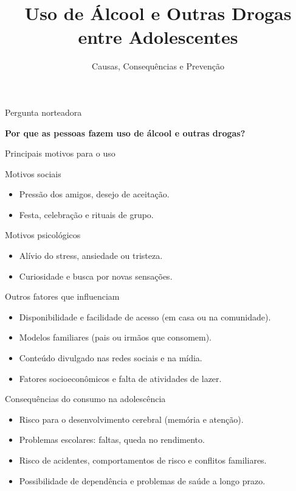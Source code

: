 \documentclass[aspectratio=169]{beamer}
\title{Uso de Álcool e Outras Drogas entre Adolescentes}
\subtitle{Causas, Consequências e Prevenção}
\author{}
\date{}
\begin{document}
\begin{frame}
  \titlepage
\end{frame}

\begin{frame}{Pergunta norteadora}
  \begin{center}
    \Large{\textbf{Por que as pessoas fazem uso de álcool e outras drogas?}}
  \end{center}
\end{frame}

\begin{frame}{Principais motivos para o uso}
  \begin{block}{Motivos sociais}
    \begin{itemize}
      \item Pressão dos amigos, desejo de aceitação.
      \item Festa, celebração e rituais de grupo.
    \end{itemize}
  \end{block}

  \begin{block}{Motivos psicológicos}
    \begin{itemize}
      \item Alívio do stress, ansiedade ou tristeza.
      \item Curiosidade e busca por novas sensações.
    \end{itemize}
  \end{block}
\end{frame}

\begin{frame}{Outros fatores que influenciam}
  \begin{itemize}
    \item Disponibilidade e facilidade de acesso (em casa ou na comunidade).
    \item Modelos familiares (pais ou irmãos que consomem).
    \item Conteúdo divulgado nas redes sociais e na mídia.
    \item Fatores socioeconômicos e falta de atividades de lazer.
  \end{itemize}
\end{frame}

\begin{frame}{Consequências do consumo na adolescência}
  \begin{itemize}
    \item Risco para o desenvolvimento cerebral (memória e atenção).
    \item Problemas escolares: faltas, queda no rendimento.
    \item Risco de acidentes, comportamentos de risco e conflitos familiares.
    \item Possibilidade de dependência e problemas de saúde a longo prazo.
  \end{itemize}
\end{frame}
\end{document}
